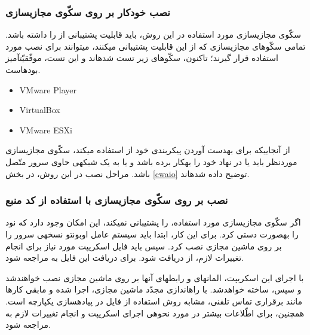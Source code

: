 {\subsubsection{نصب خودکار بر روی سکّوی مجازی\nf سازی}

سکّوی مجازی\nf سازی مورد استفاده در این روش، باید قابلیت پشتیبانی از  را داشته باشد. تمامی سکّوهای مجازی\nf سازی که از این قابلیت پشتیبانی می\nf کنند، می\nf توانند برای نصب مورد استفاده قرار گیرند؛ تاکنون، سکّوهای زیر تست شده\nf اند و این تست، موفّقیّت\nf آمیز بوده\nf است.
\begin{latin}
\begin{itemize}
\item VMware Player
\item VirtualBox
\item VMware ESXi
\end{itemize}
\end{latin}
از آنجایی\nf که   برای به\nf دست آوردن پیکربندی  خود از  استفاده می\nf کند، سکّوی مجازی\nf سازی موردنظر باید یا در نهاد خود  را به\nf کار برده باشد و یا به یک شبکه\nf ی حاوی سرور  متّصل باشد. مراحل نصب در این روش، در بخش \ref{cwaio} توضیح داده شده\nf اند.

\subsubsection{نصب بر روی سکّوی مجازی\nf سازی با استفاده از کد منبع}

اگر سکّوی مجازی\nf سازی مورد استفاده،  را پشتیبانی نمی\nf کند، این امکان وجود دارد که نود  را به\nf صورت دستی  کرد. برای این کار، ابتدا باید سیستم عامل اوبونتو  نسخه\nf ی سرور را بر روی ماشین مجازی نصب کرد. سپس باید فایل اسکریپت مورد نیاز برای انجام تغییرات لازم، از  دریافت شود. برای دریافت این فایل به \cite{gitmanual} مراجعه شود.

با اجرای این اسکریپت، المان\nf های  و رابط\nf های آن\nf ها بر روی ماشین مجازی نصب خواهندشد و سپس،  ساخته خواهدشد. با راه\nf اندازی مجدّد ماشین مجازی،  اجرا شده و مابقی کارها مانند برقراری تماس تلفنی، مشابه روش استفاده از فایل  در پیاده\nf سازی یکپارچه است. همچنین، برای اطّلاعات بیشتر در مورد نحوه\nf ی اجرای اسکریپت و انجام تغییرات لازم به \cite{webmanual} مراجعه شود.


}
